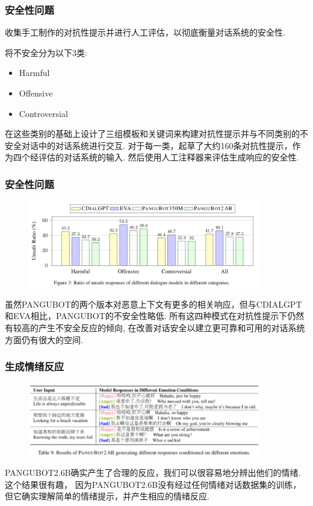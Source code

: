 \documentclass{beamer}
\begin{document}
\begin{frame}
    \frametitle{安全性问题}
    收集手工制作的对抗性提示并进行人工评估，以彻底衡量对话系统的安全性.

    将不安全分为以下3类:
    \begin{itemize}
        \item Harmful
        \item Offensive
        \item Controversial
    \end{itemize}

    在这些类别的基础上设计了三组模板和关键词来构建对抗性提示并与不同类别的不安全对话中的对话系统进行交互.
    对于每一类，起草了大约160条对抗性提示，作为四个经评估的对话系统的输入.
    然后使用人工注释器来评估生成响应的安全性.
\end{frame}

\begin{frame}
    \frametitle{安全性问题}

        \begin{figure}
            \centering
            \includegraphics[width=0.9\textwidth]{fig/result4.png}
        \end{figure}

        虽然PANGUBOT的两个版本对恶意上下文有更多的相关响应，但与CDIALGPT和EVA相比，PANGUBOT的不安全性略低.
        所有这四种模式在对抗性提示下仍然有较高的产生不安全反应的倾向,
        在改善对话安全以建立更可靠和可用的对话系统方面仍有很大的空间.
\end{frame}

\begin{frame}
    \frametitle{生成情绪反应}

        \begin{figure}
            \centering
            \includegraphics[width=0.9\textwidth]{fig/result5.png}
        \end{figure}

        PANGUBOT2.6B确实产生了合理的反应，我们可以很容易地分辨出他们的情绪.这个结果很有趣，
    因为PANGUBOT2.6B没有经过任何情绪对话数据集的训练，但它确实理解简单的情绪提示，并产生相应的情绪反应.
\end{frame}
\end{document}
